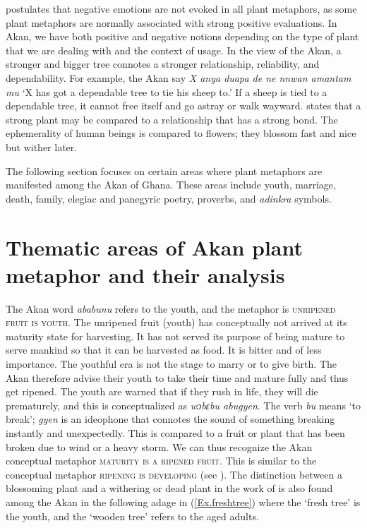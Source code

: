 \documentclass[output=paper,colorlinks,citecolor=brown]{langscibook}
\begin{document}
\citet{Charteris-Black2004} postulates that negative emotions are not evoked in all plant metaphors, as some plant metaphors are normally associated with strong positive evaluations. In Akan, we have both positive and negative notions depending on the type of plant that we are dealing with and the context of usage. In the view of the Akan, a stronger and bigger tree connotes a stronger relationship, reliability, and dependability. For example, the Akan say \textit{X anya duapa de ne nnwan amantam mu} ‘X has got a dependable tree to tie his sheep to.’ If a sheep is tied to a dependable tree, it cannot free itself and go astray or walk wayward. \citet[83]{GathigiaandMaitaria2019} states that a strong plant may be compared to a relationship that has a strong bond. The ephemerality of human beings is compared to flowers; they blossom fast and nice but wither later. 

The following section focuses on certain areas where plant metaphors are manifested among the Akan of Ghana. These areas include youth, marriage, death, family, elegiac and panegyric poetry, proverbs, and \textit{adinkra} symbols. 

\section{Thematic areas of Akan plant metaphor and their analysis} \label{07_THematic}

The Akan word \textit{ababunu} refers to the youth, and the metaphor is \textsc{unripened fruit is youth}. The unripened fruit (youth) has conceptually not arrived at its maturity state for harvesting. It has not served its purpose of being mature to serve mankind so that it can be harvested as food. It is bitter and of less importance. The youthful era is not the stage to marry or to give birth. The Akan therefore advise their youth to take their time and mature fully and thus get ripened. The youth are warned that if they rush in life, they will die prematurely, and this is  conceptualized as \textit{wɔbɛbu abugyen}. The verb \textit{bu} means ‘to break’; \textit{gyen} is an ideophone that connotes the sound of something breaking instantly and unexpectedly. This is compared to a fruit or plant that has been broken due to wind or a heavy storm. We can thus recognize the Akan conceptual metaphor \textsc{maturity is a ripened fruit}. This is similar to the  conceptual metaphor \textsc{ripening is developing} (see \cite[18]{Filipczuk-Rosińska2016}). The distinction between a blossoming plant and a withering or dead plant in the work of \citet{Filipczuk-Rosińska2016} is also found among the Akan in the following adage in (\ref{Ex.freshtree}) where the `fresh tree' is the youth, and the `wooden tree' refers to the aged adults.
\end{document}
